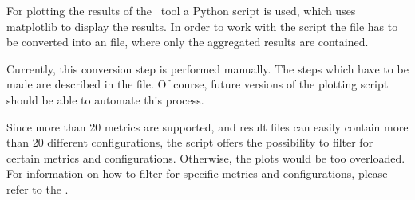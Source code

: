 For plotting the results of the \multiexec\ tool a Python script is used, which 
uses matplotlib to display the results. 
In order to work with the script the  file has to be 
converted into an  file, where only the aggregated results 
are contained. 

Currently, this conversion step is performed manually. 
The steps which have to be made are described in the  file. 
Of course, future versions of the plotting script should be able to automate 
this process.

Since more than 20 metrics are supported, and result files can easily contain 
more than 20 different configurations, the script offers the possibility to 
filter for certain metrics and configurations. 
Otherwise, the plots would be too overloaded.
For information on how to filter for specific metrics and configurations, 
please refer to the .